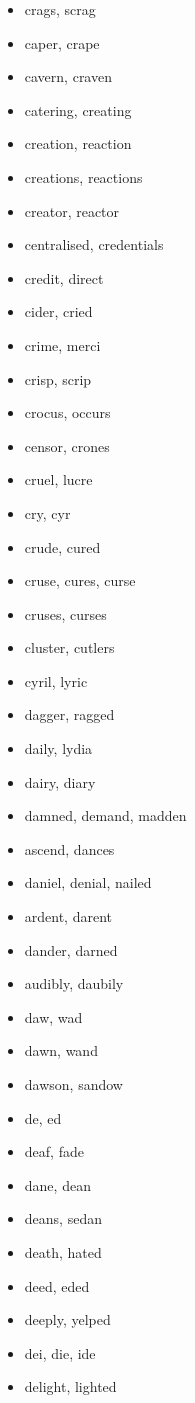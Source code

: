 \documentclass[a4wide,11pt]{report}
\begin{document}
\begin{itemize}
  \item crags, scrag
  \item caper, crape
  \item cavern, craven
  \item catering, creating
  \item creation, reaction
  \item creations, reactions
  \item creator, reactor
  \item centralised, credentials
  \item credit, direct
  \item cider, cried
  \item crime, merci
  \item crisp, scrip
  \item crocus, occurs
  \item censor, crones
  \item cruel, lucre
  \item cry, cyr
  \item crude, cured
  \item cruse, cures, curse
  \item cruses, curses
  \item cluster, cutlers
  \item cyril, lyric
  \item dagger, ragged
  \item daily, lydia
  \item dairy, diary
  \item damned, demand, madden
  \item ascend, dances
  \item daniel, denial, nailed
  \item ardent, darent
  \item dander, darned
  \item audibly, daubily
  \item daw, wad
  \item dawn, wand
  \item dawson, sandow
  \item de, ed
  \item deaf, fade
  \item dane, dean
  \item deans, sedan
  \item death, hated
  \item deed, eded
  \item deeply, yelped
  \item dei, die, ide
  \item delight, lighted

\end{itemize}
\end{document}
